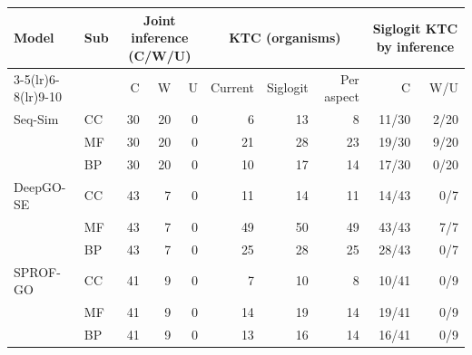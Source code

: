 \begin{tabular}{llrrrrrrrr}
\toprule
Model & Sub & \multicolumn{3}{c}{Joint inference (C/W/U)} & \multicolumn{3}{c}{KTC (organisms)} & \multicolumn{2}{c}{Siglogit KTC by inference} \\
\cmidrule(lr){3-5}\cmidrule(lr){6-8}\cmidrule(lr){9-10}
& & C & W & U & Current & Siglogit & Per aspect & C & W/U \\
\midrule
Seq-Sim & CC & 30 & 20 & 0 & 6 & 13 & 8 & 11/30 & 2/20 \\
 & MF & 30 & 20 & 0 & 21 & 28 & 23 & 19/30 & 9/20 \\
 & BP & 30 & 20 & 0 & 10 & 17 & 14 & 17/30 & 0/20 \\
\midrule
DeepGO-SE & CC & 43 & 7 & 0 & 11 & 14 & 11 & 14/43 & 0/7 \\
 & MF & 43 & 7 & 0 & 49 & 50 & 49 & 43/43 & 7/7 \\
 & BP & 43 & 7 & 0 & 25 & 28 & 25 & 28/43 & 0/7 \\
\midrule
SPROF-GO & CC & 41 & 9 & 0 & 7 & 10 & 8 & 10/41 & 0/9 \\
 & MF & 41 & 9 & 0 & 14 & 19 & 14 & 19/41 & 0/9 \\
 & BP & 41 & 9 & 0 & 13 & 16 & 14 & 16/41 & 0/9 \\
\bottomrule
\end{tabular}
